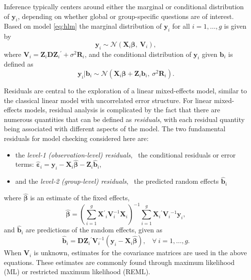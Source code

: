 \documentclass[12pt]{article} %
\newcommand{\inv}{\ensuremath{^{-1}}}
\newcommand{\trans}{\ensuremath{^\prime}}
\begin{document}
Inference typically centers around either the marginal or conditional distribution of $\bm{y}_i$, depending on whether global or group-specific questions are of interest.
Based on model \eqref{eq:hlm} the marginal distribution of $\bm{y}_i$ for all $i = 1, \ldots, g$ is given by
%
\begin{equation}\label{eq:marginalmod}
\bm{y}_i \sim \mathcal{N}\left(\bm{X}_i\bm{\beta},\ \bm{V}_i \right),
\end{equation}
%
where $\bm{V}_i = \bm{Z}_i \bm{DZ}_i\trans + \sigma^2 \bm{R}_i$, and the conditional distribution of $\bm{y}_i$ given $\bm{b}_i$ is defined as
%
\begin{equation}\label{eq:conditionalmod}
\bm{y}_i | \bm{b}_i \sim \mathcal{N}\left(\bm{X}_i\bm{\beta} + \bm{Z}_i \bm{b}_i, \ \sigma^2 \bm{R}_i \right).
\end{equation}
%


Residuals are central to the exploration of a linear mixed-effects model, similar to the classical linear model with uncorrelated error structure. For linear mixed-effects models, residual analysis is complicated by the fact that there are numerous quantities that can be defined as \emph{residuals}, with each residual quantity being associated with different aspects of the model. The two fundamental residuals for model checking considered here are:
%
\begin{itemize}
\item the \emph{level-1 (observation-level) residuals}, ~the conditional residuals or error terms: $\widehat{\bm{\varepsilon}}_i = \bm{y}_i - \bm{X}_i \widehat{\bm{\beta}} - \bm{Z}_i \widehat{\bm{b}}_i$,

\item and the \emph{level-2 (group-level) residuals}, ~the predicted random effects $\widehat{\bm{b}}_i$
\end{itemize}
%
where $\widehat{\bm{\beta}}$ is an estimate of the fixed effects, %
\begin{equation}\label{eq:glsb}
	\widehat{\bm{\beta}} = 
	\left(\sum^g_{i=1} \bm{X}\trans_i \bm{V}^{-1}_i \bm{X}_i \right)^{-1} 
	\sum^g_{i=1} \bm{X}_i\trans \bm{V}_i\inv \bm{y}_i,
\end{equation}
and $\widehat{\bm{b}}_i$ are predictions of the random effects, given as
\begin{equation}\label{eq:eb}
	\widehat{\bm{b}}_i = \bm{D} \bm{Z}_i\trans \bm{V}_i^{-1} 
	\left(\bm{y}_i - \bm{X}_i \widehat{\bm{\beta}} \right), \ \ \ \ \forall\ i = 1, \ldots, g.
\end{equation}
%
When $\bm{V}_i$ is unknown, estimates for the covariance matrices are used in the above equations. These estimates are commonly found through maximum likelihood (ML) or restricted maximum likelihood (REML). %
\end{document}
